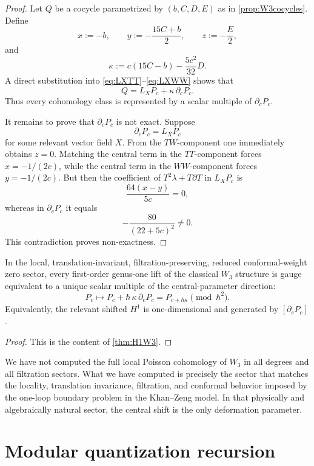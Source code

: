 \begin{proof}
Let $Q$ be a cocycle parametrized by $(b,C,D,E)$ as in \cref{prop:W3cocycles}.
Define
\[
x:=-b,\qquad
y:=-\frac{15C+b}{2},\qquad
z:=-\frac E2,
\]
and
\[
\kappa:=c(15C-b)-\frac{5c^2}{32}D.
\]
A direct substitution into \eqref{eq:LXTT}--\eqref{eq:LXWW} shows that
\[
Q=L_XP_c+\kappa\,\partial_cP_c.
\]
Thus every cohomology class is represented by a scalar multiple of $\partial_cP_c$.

It remains to prove that $\partial_cP_c$ is not exact. Suppose
\[
\partial_cP_c=L_XP_c
\]
for some relevant vector field $X$. From the $TW$-component one immediately obtains
$z=0$. Matching the central term in the $TT$-component forces $x=-1/(2c)$, while the
central term in the $WW$-component forces $y=-1/(2c)$. But then the coefficient of
$T^2\lambda+T\partial T$ in $L_XP_c$ is
\[
\frac{64(x-y)}{5c}=0,
\]
whereas in $\partial_cP_c$ it equals
\[
-\frac{80}{(22+5c)^2}\neq 0.
\]
This contradiction proves non-exactness.
\end{proof}

\begin{corollary}\label{cor:unique-lift}
In the local, translation-invariant, filtration-preserving, reduced conformal-weight zero
sector, every first-order genus-one lift of the classical $W_3$ structure is gauge equivalent
to a unique scalar multiple of the central-parameter direction:
\[
P_c\longmapsto P_c+\hbar\,\kappa\,\partial_cP_c
=
P_{c+\hbar\kappa}\pmod{\hbar^2}.
\]
Equivalently, the relevant shifted $H^1$ is one-dimensional and generated by
$[\partial_cP_c]$.
\end{corollary}

\begin{proof}
This is the content of \cref{thm:H1W3}.
\end{proof}

\begin{remark}
We have not computed the full local Poisson cohomology of $W_3$ in all degrees and all
filtration sectors. What we have computed is precisely the sector that matches the locality,
translation invariance, filtration, and conformal behavior imposed by the one-loop boundary
problem in the Khan--Zeng model. In that physically and algebraically natural sector, the
central shift is the only deformation parameter.
\end{remark}

\section{Modular quantization recursion}

